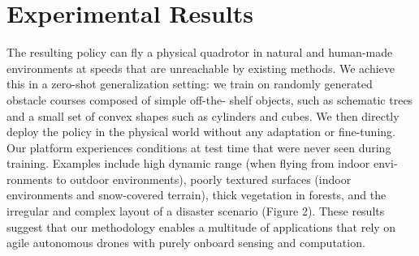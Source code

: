 \chapter{Experimental Results}
The resulting policy can fly a physical quadrotor in natural and
human-made environments at speeds that are unreachable by existing
methods. We achieve this in a zero-shot generalization setting: we train
on randomly generated obstacle courses composed of simple off-the-
shelf objects, such as schematic trees and a small set of convex shapes
such as cylinders and cubes. We then directly deploy the policy in the
physical world without any adaptation or fine-tuning. Our platform
experiences conditions at test time that were never seen during training.
Examples include high dynamic range (when flying from indoor envi-
ronments to outdoor environments), poorly textured surfaces (indoor
environments and snow-covered terrain), thick vegetation in forests,
and the irregular and complex layout of a disaster scenario (Figure 2).
These results suggest that our methodology enables a multitude of
applications that rely on agile autonomous drones with purely onboard
sensing and computation.
